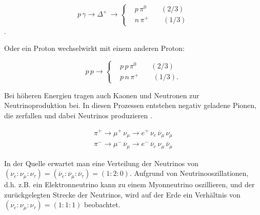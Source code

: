 \begin{equation*}
p\, \gamma \rightarrow \Delta^+ \, \rightarrow	
\left\{
\begin{aligned}
& p \, \pi^0 \qquad (2/3) \\
& n \, \pi^+ \qquad (1/3)
\end{aligned}
\right.
\end{equation*}.

Oder ein Proton wechselwirkt mit einem anderen Proton\cite{DissBecker}:

\begin{equation*}
p \, p \rightarrow
\left\{
\begin{aligned}
& p \, p \, \pi^0 \qquad (2/3) \\
& p \, n \, \pi^+ \qquad (1/3).
\end{aligned}
\right.
\end{equation*}

Bei höheren Energien tragen auch Kaonen und Neutronen zur Neutrinoproduktion bei.
In diesen Prozessen entstehen negativ geladene Pionen, die zerfallen und dabei Neutrinos produzieren \cite{NeutrinoOszillation}.

\begin{equation*}
 \begin{aligned}
 \pi^+ \rightarrow \mu^+ \, \nu_{\mu} \rightarrow e^+ \, \nu_e \, \overline{\nu}_{\mu} \, \nu_{\mu} \\ 
 \pi^- \rightarrow \mu^- \, \overline{\nu}_{\mu} \rightarrow e^- \, \overline{\nu}_e \, \nu_{\mu} \, \overline{\nu}_{\mu}
 \end{aligned}
\end{equation*}


In der Quelle erwartet man eine Verteilung der Neutrinos von $(\nu_e:\nu_{\mu}:\nu_{\tau})=(\overline{\nu}_e:\overline{\nu}_{\mu}:\overline{\nu}_{\tau})=(1:2:0)$\cite{NeutrinoOszillation}.
Aufgrund von Neutrinooszillationen, d.h. z.B. ein Elektronneutrino kann zu einem Myonneutrino oszillieren, und der zurückgelegten Strecke der Neutrinos, wird auf der Erde ein Verhältnis von $(\nu_e:\nu_{\mu}:\nu_{\tau})=(1:1:1)$\cite{NeutrinoOszillation} beobachtet.



